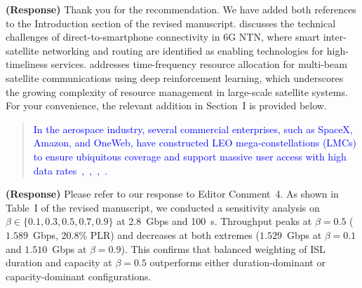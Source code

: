 \documentclass[letter]{article}
\begin{document}
\vspace{5mm}
{\bf (Response)}
Thank you for the recommendation. We have added both references to the Introduction section of the revised manuscript. \cite{he2024direct} discusses the technical challenges of direct-to-smartphone connectivity in 6G NTN, where smart inter-satellite networking and routing are identified as enabling technologies for high-timeliness services. \cite{he2022multi} addresses time-frequency resource allocation for multi-beam satellite communications using deep reinforcement learning, which underscores the growing complexity of resource management in large-scale satellite systems. For your convenience, the relevant addition in Section~I is provided below.

\begin{quote}
\textcolor{blue}{In the aerospace industry, several commercial enterprises, such as SpaceX, Amazon, and OneWeb, have constructed LEO mega-constellations (LMCs) to ensure ubiquitous coverage and support massive user access with high data rates~\cite{wang2022mega},~\cite{cao2025dense},~\cite{he2024direct},~\cite{he2022multi}.}
\end{quote}

\vspace{10mm}
\noindent {}

\vspace{5mm}
{\bf (Response)}
Please refer to our response to Editor Comment~4. As shown in Table~I of the revised manuscript, we conducted a sensitivity analysis on $\beta \in \{0.1, 0.3, 0.5, 0.7, 0.9\}$ at 2.8~Gbps and 100~s. Throughput peaks at $\beta = 0.5$ ($1.589$~Gbps, $20.8\%$ PLR) and decreases at both extremes ($1.529$~Gbps at $\beta = 0.1$ and $1.510$~Gbps at $\beta = 0.9$). This confirms that balanced weighting of ISL duration and capacity at $\beta = 0.5$ outperforms either duration-dominant or capacity-dominant configurations.

\vspace{10mm}
\noindent {}
\end{document}
